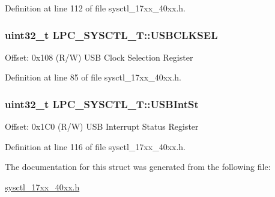 Definition at line 112 of file sysctl\+\_\+17xx\+\_\+40xx.\+h.

\subsubsection[{\texorpdfstring{U\+S\+B\+C\+L\+K\+S\+EL}{USBCLKSEL}}]{ uint32\+\_\+t L\+P\+C\+\_\+\+S\+Y\+S\+C\+T\+L\+\_\+\+T\+::\+U\+S\+B\+C\+L\+K\+S\+EL}\hypertarget{structLPC__SYSCTL__T_a6d004c6e6657a7fe78e75bd3e3ea00c4}{}\label{structLPC__SYSCTL__T_a6d004c6e6657a7fe78e75bd3e3ea00c4}
Offset\+: 0x108 (R/W) U\+SB Clock Selection Register 

Definition at line 85 of file sysctl\+\_\+17xx\+\_\+40xx.\+h.

\subsubsection[{\texorpdfstring{U\+S\+B\+Int\+St}{USBIntSt}}]{ uint32\+\_\+t L\+P\+C\+\_\+\+S\+Y\+S\+C\+T\+L\+\_\+\+T\+::\+U\+S\+B\+Int\+St}\hypertarget{structLPC__SYSCTL__T_a0505fe464c77b1421ebbd8f9d1cd9f2a}{}\label{structLPC__SYSCTL__T_a0505fe464c77b1421ebbd8f9d1cd9f2a}
Offset\+: 0x1\+C0 (R/W) U\+SB Interrupt Status Register 

Definition at line 116 of file sysctl\+\_\+17xx\+\_\+40xx.\+h.



The documentation for this struct was generated from the following file\+:\begin{DoxyCompactItemize}
\item 
\hyperlink{sysctl__17xx__40xx_8h}{sysctl\+\_\+17xx\+\_\+40xx.\+h}\end{DoxyCompactItemize}
